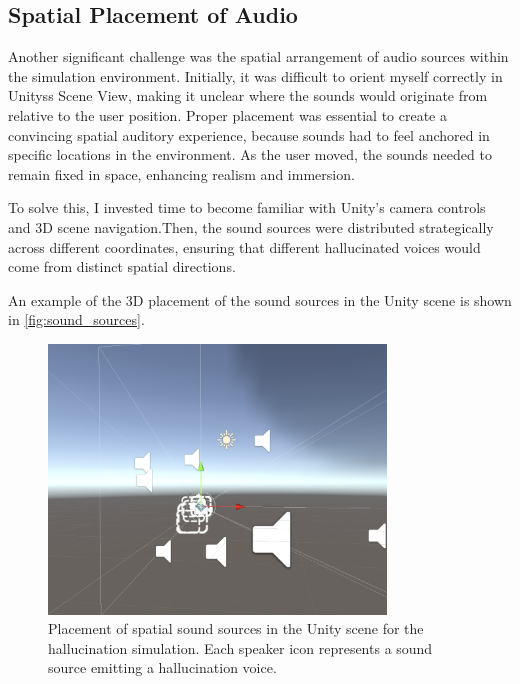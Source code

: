 \subsection{Spatial Placement of Audio } 
Another significant challenge was the spatial arrangement of audio sources within the simulation environment. Initially, it was difficult to orient myself correctly in Unityss Scene View, making it unclear where the sounds would originate from relative to the user position. Proper placement was essential to create a convincing spatial auditory experience, because sounds had to feel anchored in specific locations in the environment. As the user moved, the sounds needed to remain fixed in space, enhancing realism and immersion.

To solve this, I invested time to become familiar with Unity's camera controls and 3D scene navigation.Then, the sound sources were distributed strategically across different coordinates, ensuring that different hallucinated voices would come from distinct spatial directions.

An example of the 3D placement of the sound sources in the Unity scene is shown in \autoref{fig:sound_sources}.

\begin{figure}[h!] \centering \includegraphics[width=0.8\textwidth]{../../Figures/unity-scene.png} \caption{Placement of spatial sound sources in the Unity scene for the hallucination simulation. Each speaker icon represents a sound source emitting a hallucination voice.} \label{fig:sound_sources} \end{figure}

